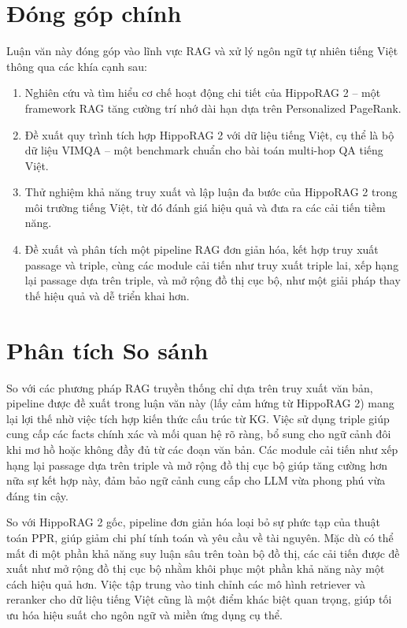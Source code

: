 \documentclass[../main.tex]{subfiles}
\begin{document}
\section{Đóng góp chính}
Luận văn này đóng góp vào lĩnh vực RAG và xử lý ngôn ngữ tự nhiên tiếng Việt thông qua các khía cạnh sau:
\begin{enumerate}
    \item Nghiên cứu và tìm hiểu cơ chế hoạt động chi tiết của HippoRAG 2 – một framework RAG tăng cường trí nhớ dài hạn dựa trên Personalized PageRank.
    \item Đề xuất quy trình tích hợp HippoRAG 2 với dữ liệu tiếng Việt, cụ thể là bộ dữ liệu VIMQA – một benchmark chuẩn cho bài toán multi-hop QA tiếng Việt.
    \item Thử nghiệm khả năng truy xuất và lập luận đa bước của HippoRAG 2 trong môi trường tiếng Việt, từ đó đánh giá hiệu quả và đưa ra các cải tiến tiềm năng.
    \item Đề xuất và phân tích một pipeline RAG đơn giản hóa, kết hợp truy xuất passage và triple, cùng các module cải tiến như truy xuất triple lai, xếp hạng lại passage dựa trên triple, và mở rộng đồ thị cục bộ, như một giải pháp thay thế hiệu quả và dễ triển khai hơn.
\end{enumerate}

\section{Phân tích So sánh}
So với các phương pháp RAG truyền thống chỉ dựa trên truy xuất văn bản, pipeline được đề xuất trong luận văn này (lấy cảm hứng từ HippoRAG 2) mang lại lợi thế nhờ việc tích hợp kiến thức cấu trúc từ KG. Việc sử dụng triple giúp cung cấp các facts chính xác và mối quan hệ rõ ràng, bổ sung cho ngữ cảnh đôi khi mơ hồ hoặc không đầy đủ từ các đoạn văn bản. Các module cải tiến như xếp hạng lại passage dựa trên triple và mở rộng đồ thị cục bộ giúp tăng cường hơn nữa sự kết hợp này, đảm bảo ngữ cảnh cung cấp cho LLM vừa phong phú vừa đáng tin cậy.

So với HippoRAG 2 gốc, pipeline đơn giản hóa loại bỏ sự phức tạp của thuật toán PPR, giúp giảm chi phí tính toán và yêu cầu về tài nguyên. Mặc dù có thể mất đi một phần khả năng suy luận sâu trên toàn bộ đồ thị, các cải tiến được đề xuất như mở rộng đồ thị cục bộ nhằm khôi phục một phần khả năng này một cách hiệu quả hơn. Việc tập trung vào tinh chỉnh các mô hình retriever và reranker cho dữ liệu tiếng Việt cũng là một điểm khác biệt quan trọng, giúp tối ưu hóa hiệu suất cho ngôn ngữ và miền ứng dụng cụ thể.
\end{document}
